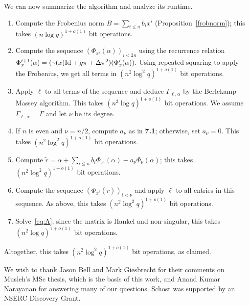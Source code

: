 \documentclass[sigconf]{acmart}
\begin{document}
\smallskip{} We can now summarize the algorithm and
analyze its runtime.
\begin{enumerate}
\item Compute the Frobenius norm $B=\sum_{i \le n} b_i x^i$ (Proposition~\ref{frobnorm});
this takes $(n \log q)^{1+o(1)}$ bit operations.
\item Compute the sequence $(\Phi_{x^{i}}(\alpha))_{i < 2n}$ using the
  recurrence relation $\Phi_x^{i+1}(\alpha) = (\gamma(x) {\rm Id} +
  g\pi + \Delta \pi^2)(\Phi_x^i(\alpha))$. Using repeated squaring to
  apply the Frobenius, we get all terms in $(n^2 \log^2 q)^{1+o(1)}$ bit
  operations.
\item Apply $\ell$ to all terms of the sequence and deduce
  $\Gamma_{\ell,\alpha}$ by the Berlekamp-Massey algorithm. This takes
  $(n^2 \log q)^{1+o(1)}$ bit operations. We assume
  $\Gamma_{\ell,\alpha}=\Gamma$ and let $\nu$ be its degree.
\item If $n$ is even and $\nu=n/2$, compute $a_\nu$ as in {\bf 7.1};
  otherwise, set $a_\nu=0$. This takes $(n^2 \log^2 q)^{1+o(1)}$ bit
  operations.
\item Compute $\tilde r = \alpha + \sum_{i \le n} b_i
  \Phi_{x^{i}}(\alpha) - a_\nu \Phi_\nu(\alpha)$; this takes $(n^2
  \log^2 q)^{1+o(1)}$ bit operations.
\item Compute the sequence $(\Phi_{x^{i}}(\tilde r))_{i < \nu}$
  and apply $\ell$ to all entries in this sequence. As above, this takes
 $(n^2 \log^2 q)^{1+o(1)}$ bit
  operations.
\item Solve~\eqref{eq:A}; since the matrix is Hankel and non-singular,
  this takes $(n^2 \log q)^{1+o(1)}$ bit operations.
\end{enumerate}
Altogether, this takes  $(n^2 \log^2 q)^{1+o(1)}$ bit operations,
as claimed.


\begin{acks}
  We wish to thank Jason Bell and Mark Giesbrecht for their comments
  on Musleh's MSc thesis, which is the basis of this work, and Anand
Kumar  Narayanan for answering many of our questions. Schost was supported
  by an NSERC Discovery Grant.
\end{acks}





\end{document}
